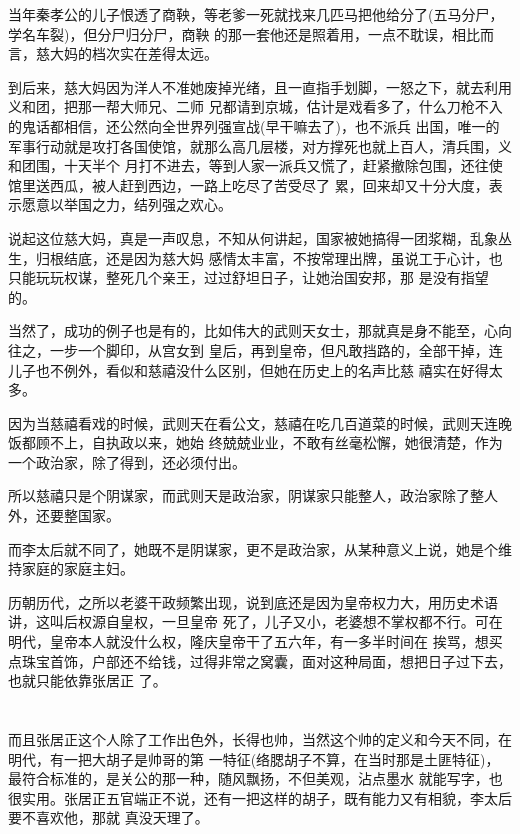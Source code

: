\documentclass[11pt,a4paper,onecolumn]{article}
\begin{document}
当年秦孝公的儿子恨透了商鞅，等老爹一死就找来几匹马把他给分了(五马分尸，学名车裂)，但分尸归分尸，商鞅
的那一套他还是照着用，一点不耽误，相比而言，慈大妈的档次实在差得太远。

到后来，慈大妈因为洋人不准她废掉光绪，且一直指手划脚，一怒之下，就去利用义和团，把那一帮大师兄、二师
兄都请到京城，估计是戏看多了，什么刀枪不入的鬼话都相信，还公然向全世界列强宣战(早干嘛去了)，也不派兵
出国，唯一的军事行动就是攻打各国使馆，就那么高几层楼，对方撑死也就上百人，清兵围，义和团围，十天半个
月打不进去，等到人家一派兵又慌了，赶紧撤除包围，还往使馆里送西瓜，被人赶到西边，一路上吃尽了苦受尽了
累，回来却又十分大度，表示愿意以举国之力，结列强之欢心。

说起这位慈大妈，真是一声叹息，不知从何讲起，国家被她搞得一团浆糊，乱象丛生，归根结底，还是因为慈大妈
感情太丰富，不按常理出牌，虽说工于心计，也只能玩玩权谋，整死几个亲王，过过舒坦日子，让她治国安邦，那
是没有指望的。

当然了，成功的例子也是有的，比如伟大的武则天女士，那就真是身不能至，心向往之，一步一个脚印，从宫女到
皇后，再到皇帝，但凡敢挡路的，全部干掉，连儿子也不例外，看似和慈禧没什么区别，但她在历史上的名声比慈
禧实在好得太多。

因为当慈禧看戏的时候，武则天在看公文，慈禧在吃几百道菜的时候，武则天连晚饭都顾不上，自执政以来，她始
终兢兢业业，不敢有丝毫松懈，她很清楚，作为一个政治家，除了得到，还必须付出。

所以慈禧只是个阴谋家，而武则天是政治家，阴谋家只能整人，政治家除了整人外，还要整国家。

而李太后就不同了，她既不是阴谋家，更不是政治家，从某种意义上说，她是个维持家庭的家庭主妇。

历朝历代，之所以老婆干政频繁出现，说到底还是因为皇帝权力大，用历史术语讲，这叫后权源自皇权，一旦皇帝
死了，儿子又小，老婆想不掌权都不行。可在明代，皇帝本人就没什么权，隆庆皇帝干了五六年，有一多半时间在
挨骂，想买点珠宝首饰，户部还不给钱，过得非常之窝囊，面对这种局面，想把日子过下去，也就只能依靠张居正
了。

\section[\thesection]{}

而且张居正这个人除了工作出色外，长得也帅，当然这个帅的定义和今天不同，在明代，有一把大胡子是帅哥的第
一特征(络腮胡子不算，在当时那是土匪特征)，最符合标准的，是关公的那一种，随风飘扬，不但美观，沾点墨水
就能写字，也很实用。张居正五官端正不说，还有一把这样的胡子，既有能力又有相貌，李太后要不喜欢他，那就
真没天理了。
\end{document}
